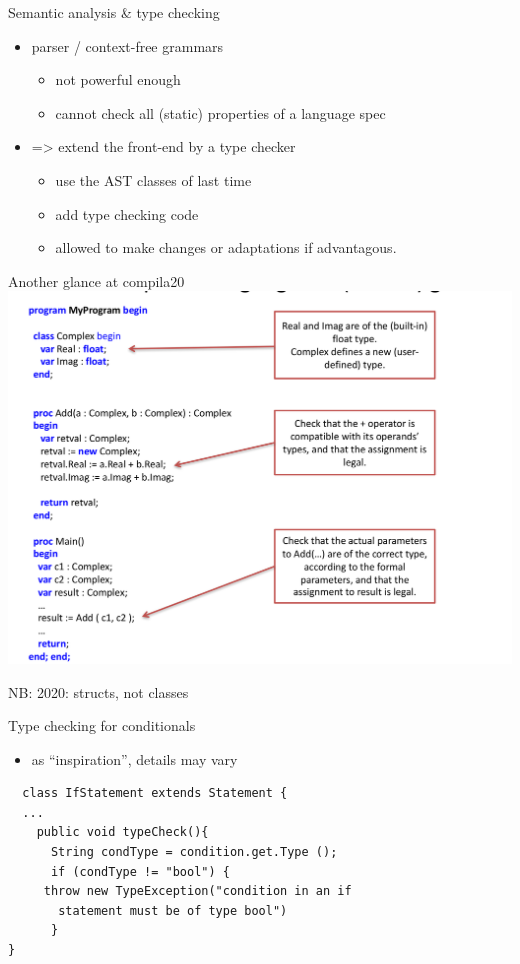 \documentclass{beamer}
\begin{document}
\begin{frame}[label={sec:org06b23e8}]{Semantic analysis \& type checking}
\begin{itemize}
\item parser / context-free  grammars 
\begin{itemize}
\item not powerful enough
\item cannot check all (static) properties of a language spec
\end{itemize}

\item => extend the front-end by a type checker

\begin{itemize}
\item use the AST classes of last time
\item add type checking code
\item allowed to make \alert{changes} or adaptations if advantagous.
\end{itemize}
\end{itemize}
\end{frame}


\begin{frame}[label={sec:orgc9f4ca6}]{Another glance at compila20}
\includegraphics[width=\textwidth]{figures/snaps/compilaexample-checking}


NB: 2020: structs, not classes 
\end{frame}


\begin{frame}[label={sec:org0320eb3},fragile,plain]{Type checking for conditionals}
 \begin{itemize}
\item as ``inspiration'', details may vary
\end{itemize}


\lstset{language=java,label= ,caption= ,captionpos=b,numbers=none}
\begin{lstlisting}
  class IfStatement extends Statement {
  ...
    public void typeCheck(){
      String condType = condition.get.Type ();
      if (condType != "bool") {  
	 throw new TypeException("condition in an if 
	   statement must be of type bool")
      }
}
\end{lstlisting}
\end{frame}
\end{document}
